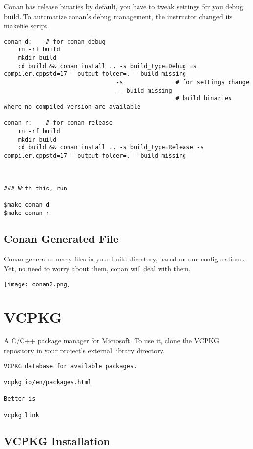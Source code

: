 \documentclass[openany]{report}
\begin{document}
Conan has release binaries by default, you have to tweak settings for you debug build.
To automatize conan's debug management, the instructor changed its makefile script.


\begin{verbatim}
conan_d:    # for conan debug
    rm -rf build
    mkdir build
    cd build && conan install .. -s build_type=Debug =s compiler.cppstd=17 --output-folder=. --build missing
                                -s               # for settings change
                                -- build missing 
                                                 # build binaries where no compiled version are available

conan_r:    # for conan release
    rm -rf build
    mkdir build
    cd build && conan install .. -s build_type=Release -s compiler.cppstd=17 --output-folder=. --build missing



### With this, run

$make conan_d
$make conan_r
\end{verbatim}  


\subsection{Conan Generated File}

Conan generates many files in your build directory, based on our configurations. Yet, no need to worry about them, conan
will deal with them.


\begin{center}
    \texttt{[image: conan2.png]}
\end{center}

\section{VCPKG}

A C/C++ package manager for Microsoft. 
To use it, clone the VCPKG repository in your project's external library directory.

\begin{verbatim}
VCPKG database for available packages.

vcpkg.io/en/packages.html

Better is 

vcpkg.link 
\end{verbatim}

\subsection{VCPKG Installation}
\end{document}
